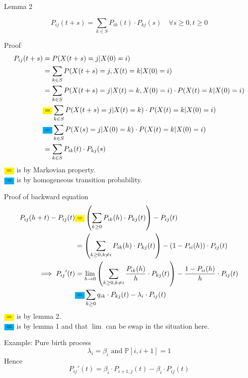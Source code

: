 \documentclass[mathserif]{beamer}
\begin{document}
\begin{frame}{Lemma 2}
\begin{lemma}
\[
P_{ij}(t+s) = \sum_{k\in S} P_{ik}(t)\cdot P_{kj}(s) \quad\forall s\geq 0, t\geq 0
\]
\end{lemma}
\end{frame}

\begin{frame}{Proof}
\begin{align*}
P_{ij}(t+s) & = P(X(t+s) = j | X(0) = i) \\
& = \sum_{k\in S} P(X(t+s) = j, X(t) = k | X(0) = i) \\
& = \sum_{k\in S} P(X(t+s) = j | X(t) = k, X(0) = i)\cdot P(X(t) = k | X(0) = i) \\
& \colorbox{yellow}{=} \sum_{k\in S} P(X(t+s) = j | X(t) = k)\cdot P(X(t) = k | X(0) = i) \\
& \colorbox{cyan}{=} \sum_{k\in S} P(X(s) = j | X(0) = k)\cdot P(X(t) = k | X(0) = i) \\
& = \sum_{k\in S} P_{ik}(t)\cdot P_{kj}(s)
\end{align*}
$\colorbox{yellow}{=}$ is by Markovian property.\\
$\colorbox{cyan}{=}$ is by homogeneous transition probability.
\end{frame}

\begin{frame}{Proof of backward equation}\label{backward_pf}
\begin{align*}
P_{ij}(h+t) - P_{ij}(t) & \colorbox{yellow}{=} \left( \sum_{k\geq 0} P_{ik}(h)\cdot P_{kj}(t) \right) - P_{ij}(t) \\
& = \left( \sum_{k\geq 0, k\neq i} P_{ik}(h)\cdot P_{kj}(t) \right) - (1 - P_{ii}(h))\cdot P_{ij}(t) \\
\implies {P_{ij}}'(t) & = \lim_{h\to 0}
\left( \sum_{k\geq 0, k\neq i} \frac{P_{ik}(h)}{h}\cdot P_{kj}(t) \right)
 - \frac{1 - P_{ii}(h)}{h}\cdot P_{ij}(t) \\
& \colorbox{cyan}{=} \sum_{k\geq 0} q_{ik}\cdot P_{kj}(t) - \lambda_i\cdot P_{ij}(t)
\end{align*}
$\colorbox{yellow}{=}$ is by lemma 2.\\
$\colorbox{cyan}{=}$ is by lemma 1 and that $\lim$ can be swap in the situation here.
\end{frame}

\begin{frame}{Example: Pure birth process}
\[
\lambda_i = \beta_i \text{ and } \mathbb{P}[i,i+1] = 1
\]
Hence
\[
{P_{ij}}'(t) = \beta_i\cdot P_{i+1,j}(t) - \beta_i\cdot P_{ij}(t)
\]
\end{frame}
\end{document}
